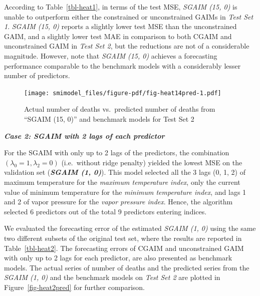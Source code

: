 \documentclass[11pt,a4paper,]{article}
\begin{document}
According to Table~\ref{tbl-heat1}, in terms of the test MSE,
\emph{SGAIM (15, 0)} is unable to outperform either the constrained or
unconstrained GAIMs in \emph{Test Set 1}. \emph{SGAIM (15, 0)} reports a
slightly lower test MSE than the unconstrained GAIM, and a slightly
lower test MAE in comparison to both CGAIM and unconstrained GAIM in
\emph{Test Set 2}, but the reductions are not of a considerable
magnitude. However, note that \emph{SGAIM (15, 0)} achieves a
forecasting performance comparable to the benchmark models with a
considerably lesser number of predictors.

\begin{figure}

{\centering \texttt{[image: smimodel\_files/figure-pdf/fig-heat14pred-1.pdf]}

}

\caption{\label{fig-heat14pred}Actual number of deaths vs.~predicted
number of deaths from ``SGAIM (15, 0)'' and benchmark models for Test
Set 2}

\end{figure}

\textbf{\emph{Case 2: SGAIM with 2 lags of each predictor}}

For the SGAIM with only up to 2 lags of the predictors, the combination
\((\lambda_{0} = 1, \lambda_{2} = 0)\) (i.e.~without ridge penalty)
yielded the lowest MSE on the validation set (\textbf{\emph{SGAIM (1,
0)}}). This model selected all the 3 lags (0, 1, 2) of maximum
temperature for the \emph{maximum temperature index}, only the current
value of minimum temperature for the \emph{minimum temperature index},
and lags 1 and 2 of vapor pressure for the \emph{vapor pressure index}.
Hence, the algorithm selected 6 predictors out of the total 9 predictors
entering indices.

We evaluated the forecasting error of the estimated \emph{SGAIM (1, 0)}
using the same two different subsets of the original test set, where the
results are reported in Table~\ref{tbl-heat2}. The forecasting errors of
CGAIM and unconstrained GAIM with only up to 2 lags for each predictor,
are also presented as benchmark models. The actual series of number of
deaths and the predicted series from the \emph{SGAIM (1, 0)} and the
benchmark models on \emph{Test Set 2} are plotted in
Figure~\ref{fig-heat2pred} for further comparison.
\end{document}
